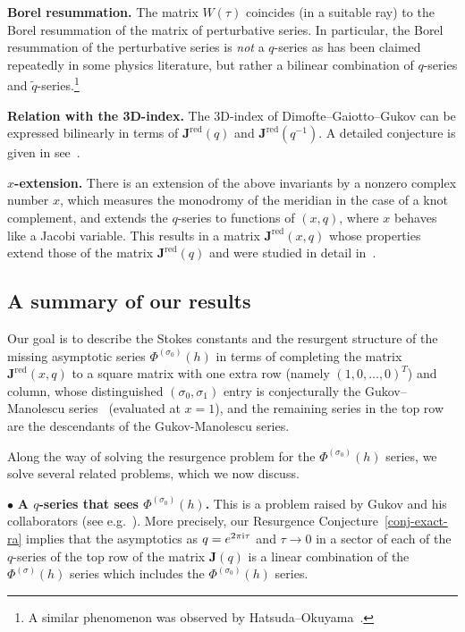 \documentclass[12pt,reqno]{amsart}
\theoremstyle{definition}
\def\s{\sigma}
\def\tq{\tilde{q}}
\def\ri{\mathrm{i}}
\def\ri{{\rm i}}
\def\bJ{\mathbf J}
\def\RED{\mathrm{red}}
\begin{document}
\noindent
{\bf Borel resummation.} 
The matrix $W(\tau)$ coincides (in a suitable ray) to the Borel resummation of the
matrix of perturbative series. In particular, the Borel resummation of the perturbative
series is \emph{not} a $q$-series %
as has been claimed repeatedly in some physics literature, but rather
a bilinear combination of $q$-series and $\tq$-series.\footnote{A similar phenomenon
  was observed by Hatsuda--Okuyama~\cite{Hatsuda-Okuyama}.}

\noindent
{\bf Relation with the 3D-index.}
The 3D-index of Dimofte--Gaiotto--Gukov can be expressed bilinearly in terms of
$\bJ^\RED(q)$ and $\bJ^\RED(q^{-1})$. A detailed conjecture is given in
see~\cite[Conj.4]{GGM:peacock}.

\noindent
{\bf $x$-extension.} 
There is an extension of the above invariants by a nonzero complex number $x$,
which measures the monodromy of the meridian in the case of a knot complement, and
extends the $q$-series to functions of $(x,q)$, where $x$ behaves like a Jacobi
variable. This results in a matrix $\bJ^\RED(x,q)$ whose properties extend those of
the matrix $\bJ^\RED(q)$ and were studied in detail in~\cite{GGM:peacock}.

\subsection{A summary of our results}
\label{sub.summary}

Our goal is to describe the Stokes constants and the resurgent structure of the missing
asymptotic series $\Phi^{(\s_0)}(h)$ in terms of completing the
matrix $\bJ^\RED(x,q)$ to a square matrix with one extra row (namely
$(1,0,\dots,0)^T$) and column, whose distinguished $(\s_0,\s_1)$ entry
is conjecturally the Gukov--Manolescu series~\cite{Gukov-Manolescu}
(evaluated at $x=1$), and the remaining series in the top row are the
descendants of the Gukov-Manolescu series.

Along the way of solving the resurgence problem for the $\Phi^{(\s_0)}(h)$ series,
we solve several related problems, which we now discuss.

\noindent $\bullet$ {\bf A $q$-series that sees $\Phi^{(\s_0)}(h)$.}
This is a problem raised by Gukov and his collaborators
(see e.g.~\cite{Gukov:BPS,Gukov-Manolescu}). More precisely, our Resurgence
Conjecture~\ref{conj-exact-ra} implies that the asymptotics as $q=e^{2\pi\ri\tau}$
and $\tau \to 0$ in a sector of each of the $q$-series of the top row of the
matrix $\bJ(q)$ is a linear combination of the $\Phi^{(\s)}(h)$ series which includes
the $\Phi^{(\s_0)}(h)$ series. 
\end{document}

